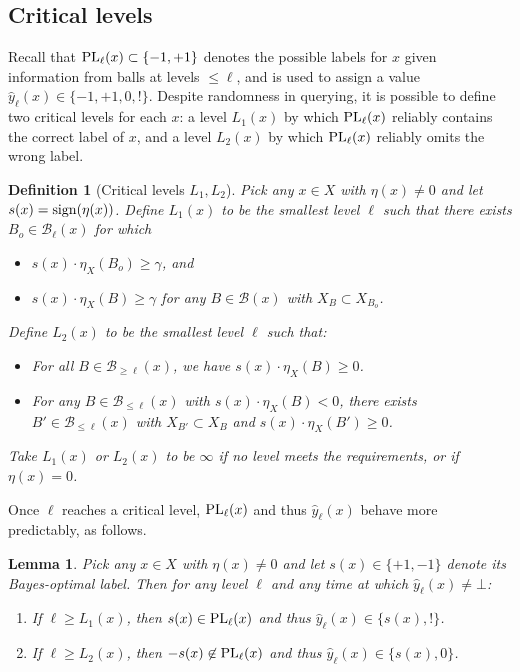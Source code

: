 \documentclass[twoside]{article}
\def\B{{\mathcal B}}
\def\yh{{\widehat{y}}}
\def\sign{{\rm sign}}
\def\PL{{\mbox{\rm PL}}}
\newtheorem{lemma}[thm]{Lemma}
\newtheorem{defn}[thm]{Definition}
\begin{document}
\subsection{Critical levels}

Recall that $\PL_\ell(x) \subset \{-1,+1\}$ denotes the possible labels for $x$ given information from balls at levels $\leq \ell$, and is used to assign a value $\yh_\ell(x) \in \{-1,+1,0,!\}$. Despite randomness in querying, it is possible to define two critical levels for each $x$: a level $L_1(x)$ by which $\PL_\ell(x)$ reliably contains the correct label of $x$, and a level $L_2(x)$ by which $\PL_\ell(x)$ reliably omits the wrong label.

\begin{defn}[Critical levels $L_1,L_2$]
Pick any $x \in X$ with $\eta(x) \neq 0$ and let $s(x) = \sign(\eta(x))$. Define $L_1(x)$ to be the smallest level $\ell$ such that there exists $B_o \in \B_\ell(x)$ for which
\begin{itemize}[leftmargin=0.5cm]
\item $s(x) \cdot \eta_X(B_o) \geq \gamma$, and
\item $s(x) \cdot \eta_X(B) \geq \gamma$ for any $B \in \B(x)$ with $X_{B} \subset X_{B_o}$.
\end{itemize}
Define $L_2(x)$ to be the smallest level $\ell$ such that:
\begin{itemize}[leftmargin=0.5cm]
\item For all $B \in \B_{\geq \ell}(x)$, we have $s(x) \cdot \eta_X(B) \geq 0$.
\item For any $B \in \B_{\leq \ell}(x)$ with $s(x) \cdot \eta_X(B) < 0$, there exists $B' \in \B_{\leq \ell}(x)$ with $X_{B'} \subset X_B$ and $s(x) \cdot \eta_X(B') \geq 0$.
\end{itemize}
Take $L_1(x)$ or $L_2(x)$ to be $\infty$ if no level meets the requirements, or if $\eta(x) = 0$. 
\label{defn:L12}
\end{defn}

Once $\ell$ reaches a critical level, $\PL_\ell(x)$ and thus $\yh_\ell(x)$ behave more predictably, as follows.
\begin{lemma}
Pick any $x \in X$ with $\eta(x) \neq 0$ and let $s(x) \in \{+1,-1\}$ denote its Bayes-optimal label. Then for any level $\ell$ and any time at which $\yh_\ell(x) \neq \bot$:
\begin{enumerate}
\item[(a)] If $\ell \geq L_1(x)$, then $s(x) \in \PL_\ell(x)$ and thus $\yh_\ell(x) \in \{s(x), !\}$. 
\item[(b)] If $\ell \geq L_2(x)$, then $-s(x) \not\in \PL_\ell(x)$ and thus $\yh_\ell(x) \in \{s(x), 0\}$.
\end{enumerate}
\label{lemma:boundary}
\end{lemma}
\end{document}

